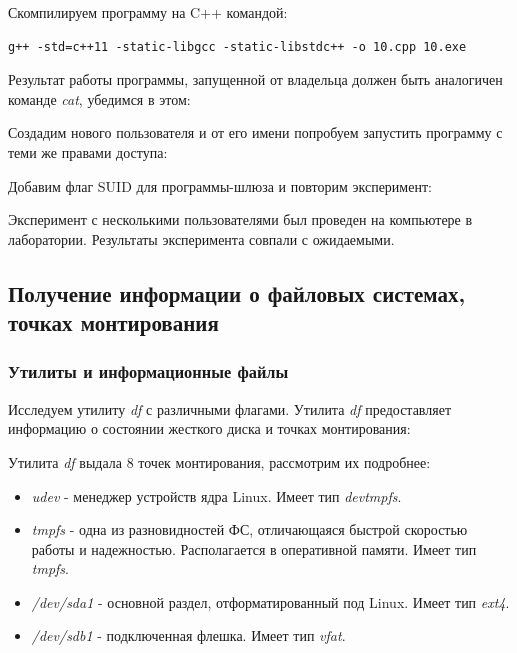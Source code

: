 \documentclass[14pt,a4paper,report]{report}
\begin{document}
Скомпилируем программу на C++ командой:

\begin{verbatim}
g++ -std=c++11 -static-libgcc -static-libstdc++ -o 10.cpp 10.exe
\end{verbatim}

Результат работы программы, запущенной от владельца должен быть аналогичен команде \emph{cat}, убедимся в этом:



Создадим нового пользователя и от его имени попробуем запустить программу с теми же правами доступа:



Добавим флаг SUID для программы-шлюза и повторим эксперимент:



Эксперимент с несколькими пользователями был проведен на компьютере в лаборатории. Результаты эксперимента совпали с ожидаемыми.

\subsection{Получение информации о файловых системах, точках монтирования}

\subsubsection{Утилиты и информационные файлы}

Исследуем утилиту \emph{df} с различными флагами. Утилита \emph{df} предоставляет информацию о состоянии жесткого диска и точках монтирования:



Утилита \emph{df} выдала 8 точек монтирования, рассмотрим их подробнее:

\begin{itemize}
	\item \emph{udev} - менеджер устройств ядра Linux. Имеет тип \emph{devtmpfs}.
	\item \emph{tmpfs} - одна из разновидностей ФС, отличающаяся быстрой скоростью работы и надежностью. Располагается в оперативной памяти. Имеет тип \emph{tmpfs}.
	\item \emph{/dev/sda1} - основной раздел, отформатированный под Linux. Имеет тип \emph{ext4}.
	\item \emph{/dev/sdb1} - подключенная флешка. Имеет тип \emph{vfat}.
\end{itemize}
\end{document}
